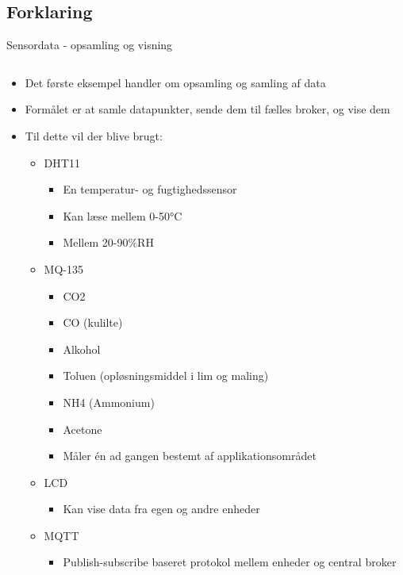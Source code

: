 \documentclass[aspectratio=169]{beamer}
\begin{document}
\subsection{Forklaring}
\begin{frame}{Sensordata - opsamling og visning}
\begin{columns}
	\begin{column}{0.6\textwidth}
		\begin{textBox}
			\begin{itemize}
				\item Det første eksempel handler om opsamling og samling af data
				\item Formålet er at samle datapunkter, sende dem til fælles broker, og vise dem
				\item Til dette vil der blive brugt:
				\begin{itemize}
					\item DHT11
					\begin{itemize}
						\item En temperatur- og fugtighedssensor
						\item Kan læse mellem 0-50°C
						\item Mellem 20-90\%RH
					\end{itemize}
					\item MQ-135
					\begin{itemize}
							\item CO2
							\item CO (kulilte)
							\item Alkohol
							\item Toluen (opløsningsmiddel i lim og maling)
							\item NH4 (Ammonium)
							\item Acetone
						\item Måler én ad gangen bestemt af applikationsområdet
					\end{itemize}
					\item LCD
					\begin{itemize}
						\item Kan vise data fra egen og andre enheder
					\end{itemize}
					\item MQTT 
					\begin{itemize}
						\item Publish-subscribe baseret protokol mellem enheder og central broker

\end{itemize}
\end{itemize}
\end{itemize}
\end{textBox}
\end{column}
\end{columns}
\end{frame}
\end{document}
